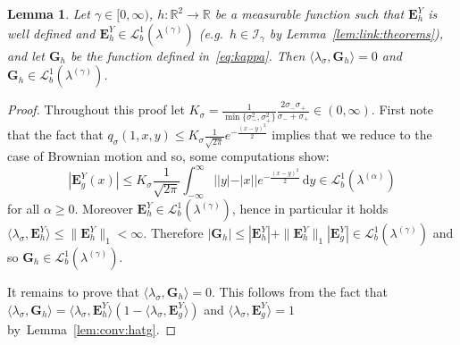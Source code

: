 \documentclass[12pt]{article}
\numberwithin{equation}{section}
\newtheorem{lemma}{Lemma}
\theoremstyle{definition}
\theoremstyle{remark}
\newcommand{\vd}{\,\mathrm{d}}
\newcommand{\Lgb}[1]{\mathcal{L}^{1}_{b}(\lambda^{(#1)})}
\newcommand{\Lg}[1]{\mathcal{I}_{#1}}
\newcommand{\bfH}[1]{\mathbf{E}^Y_{#1}}
\newcommand{\bfG}[1]{\mathbf{G}_{#1}}
\begin{document}
\begin{lemma} \label{lem:prop:kappa}
Let $\gamma\in [0,\infty)$, $h \colon \mathbb R^2 \to \mathbb R$ be a measurable function such that $\bfH{h}$ is well defined and $\bfH{h}\in \Lgb{\gamma}$ (e.g.~$h\in \Lg{\gamma}$ by Lemma~\ref{lem:link:theorems}), and let
$\bfG{h}$ be the function defined in~\eqref{eq:kappa}.
Then $\langle \lambda_\sigma , \bfG{h} \rangle=0$ and $\bfG{h} \in \Lgb{\gamma}$.
\end{lemma}
\begin{proof}
Throughout this proof let $K_\sigma =\frac1{\min\{\sigma_-^2,\sigma_+^2\}}\frac{2 \sigma_- \sigma_+}{\sigma_-+\sigma_+} \in (0,\infty) $.
First note that the fact that
$
	q_\sigma(1,x,y) \leq K_\sigma \frac{1}{\sqrt{2\pi}} e^{-\frac{(x-y)^2}{2}}
$
implies that we reduce to the case of Brownian motion and so, some computations show:
\begin{equation}
	|\bfH{g}(x)| 
	\leq K_\sigma \frac{1}{\sqrt{2\pi}}  \int_{-\infty}^{\infty} ||y|-|x|| e^{-\frac{(x-y)^2}{2}} \vd y
	\in \Lgb{\alpha}
\end{equation}
for all $\alpha \geq 0$.
Moreover $\bfH h \in \Lgb{\gamma}$, hence in particular it holds $\langle \lambda_\sigma , \bfH h \rangle \leq \|\bfH h\|_{1}<\infty$. 
Therefore $|\bfG{h}| \leq |\bfH h| + \|\bfH h\|_{1} |\bfH g| \in \Lgb{\gamma}$ and so $\bfG{h}\in \Lgb{\gamma}$.

It remains to prove that $\langle \lambda_\sigma , \bfG{h} \rangle=0$.
This follows from the fact that $\langle \lambda_\sigma , \bfG{h} \rangle= \langle \lambda_\sigma , \bfH h \rangle (1-\langle \lambda_\sigma , \bfH{g} \rangle)$ and
$\langle \lambda_\sigma , \bfH{g} \rangle=1$ by~Lemma~\ref{lem:conv:hatg}.
\end{proof}
\end{document}
